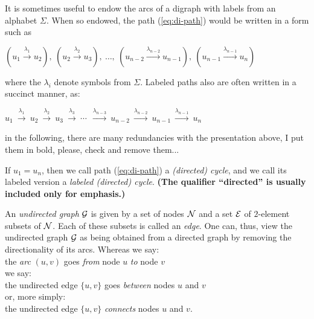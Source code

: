 It is sometimes useful to endow the arcs of a digraph with labels from
an alphabet $\Sigma$.  When so endowed, the path (\ref{eq:di-path})
would be written in a form such as

\smallskip

\hspace*{.35in}$\displaystyle
(u_1 \stackrel{\lambda_1}{\rightarrow} u_2), \ 
(u_2 \stackrel{\lambda_2}{\rightarrow} u_3), \ \ldots, \ 
(u_{n-2} \stackrel{\lambda_{n-2}}{\rightarrow} u_{n-1}), \ 
(u_{n-1} \stackrel{\lambda_{n-1}}{\rightarrow} u_n)$

\smallskip

\noindent
where the $\lambda_i$ denote symbols from $\Sigma$.  Labeled paths
also are often written in a succinct manner, as:

\smallskip

\hspace*{.35in}$\displaystyle 
u_1 \ \stackrel{\lambda_1}{\rightarrow} \ u_2
    \ \stackrel{\lambda_2}{\rightarrow} \ u_3
    \ \stackrel{\lambda_3}{\rightarrow} \ \cdots \ 
    \ \stackrel{\lambda_{n-3}}{\rightarrow} \ u_{n-2}
    \ \stackrel{\lambda_{n-2}}{\rightarrow} \ u_{n-1}
    \  \stackrel{\lambda_{n-1}}{\rightarrow} \ u_n$

\medskip

{\Denis in the following, there are many redundancies with the presentation above, I put them in bold, please, check and remove them...}

If $u_1 = u_n$, then we call path (\ref{eq:di-path}) a {\em (directed)
  cycle}, and we call its labeled version
a {\em labeled (directed) cycle}.  
\textbf{(The qualifier ``directed'' is
usually included only for emphasis.)}
\medskip

An {\em undirected graph} $\mbox{$\cal G$}$ is given by a set of nodes $\mbox{$\cal N$}$
and a set $\mbox{$\cal E$}$ 
of $2$-element subsets of $\mbox{$\cal N$}$.  Each of these subsets is called
an {\it edge}.
 
One can, thus, view the undirected graph $\mbox{$\cal G$}$ as being obtained from a
directed graph by removing the directionality of
its arcs.  Whereas we say: \\
\hspace*{.35in}the {\em arc} $(u,v)$ goes {\em from} node $u$ {\em to}
node $v$ \\
we say: \\
\hspace*{.35in}the undirected edge $\{u,v\}$ goes {\em between} nodes
$u$ and $v$ \\
or, more simply: \\
\hspace*{.35in}the undirected edge $\{u,v\}$ {\em connects} nodes $u$
and $v$.  
\medskip

